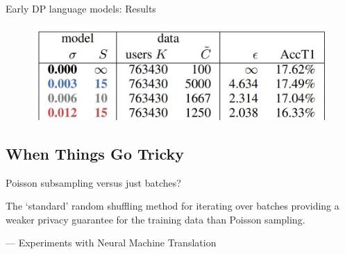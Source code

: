 \documentclass[12pt,aspectratio=169,handout]{beamer}
\begin{document}
\begin{frame}{Early DP language models: Results}

\begin{figure}
\includegraphics[width=0.8\linewidth]{img/mcmahan-table1.jpg}
\end{figure}


\end{frame}


\subsection{When Things Go Tricky}


\begin{frame}{Poisson subsampling versus just batches?}

The `standard' random shuffling method for iterating over batches providing a weaker privacy guarantee for the training data than Poisson sampling.

--- Experiments with Neural Machine Translation



\end{frame}
\end{document}

